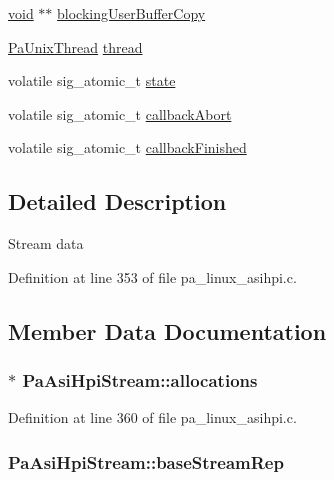 \begin{DoxyCompactItemize}
\item 
\hyperlink{sound_8c_ae35f5844602719cf66324f4de2a658b3}{void} $\ast$$\ast$ \hyperlink{struct_pa_asi_hpi_stream_a9950b6297cfa3e55110a4e079606e9e3}{blocking\+User\+Buffer\+Copy}
\item 
\hyperlink{struct_pa_unix_thread}{Pa\+Unix\+Thread} \hyperlink{struct_pa_asi_hpi_stream_ab1b5110d6b838483c92f1e914da6abee}{thread}
\item 
volatile sig\+\_\+atomic\+\_\+t \hyperlink{struct_pa_asi_hpi_stream_a3d0fb974d92bab23a1f2eab9519e4e08}{state}
\item 
volatile sig\+\_\+atomic\+\_\+t \hyperlink{struct_pa_asi_hpi_stream_a3b0ba003d3177d66b4f89a7d8b6ee659}{callback\+Abort}
\item 
volatile sig\+\_\+atomic\+\_\+t \hyperlink{struct_pa_asi_hpi_stream_aa85410e770efbd7cfed99452c314809f}{callback\+Finished}
\end{DoxyCompactItemize}


\subsection{Detailed Description}
Stream data 

Definition at line 353 of file pa\+\_\+linux\+\_\+asihpi.\+c.



\subsection{Member Data Documentation}
\subsubsection[{\texorpdfstring{allocations}{allocations}}]{$\ast$ Pa\+Asi\+Hpi\+Stream\+::allocations}\hypertarget{struct_pa_asi_hpi_stream_a73f6f13ff2d5dd03ef5df9946b5d9f5f}{}\label{struct_pa_asi_hpi_stream_a73f6f13ff2d5dd03ef5df9946b5d9f5f}


Definition at line 360 of file pa\+\_\+linux\+\_\+asihpi.\+c.

\subsubsection[{\texorpdfstring{base\+Stream\+Rep}{baseStreamRep}}]{ Pa\+Asi\+Hpi\+Stream\+::base\+Stream\+Rep}\hypertarget{struct_pa_asi_hpi_stream_a9c4b93e3228c1659e33f1f48d269c849}{}\label{struct_pa_asi_hpi_stream_a9c4b93e3228c1659e33f1f48d269c849}


